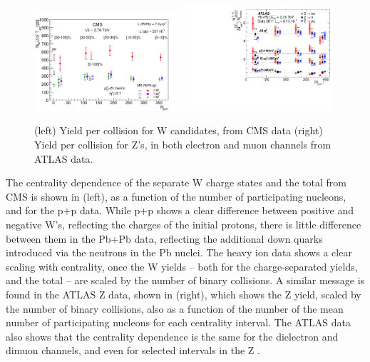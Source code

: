 \begin{figure}[!htb]
\begin{center}
\includegraphics[width=0.49\textwidth]{electroweak_figs/Fig2.pdf}
\includegraphics[width=0.49\textwidth]{electroweak_figs/fig_04.pdf}
\caption[]{(left) Yield per collision for W candidates, from CMS data (right) Yield per collision for Z's, in both electron and muon channels from ATLAS data.}
\label{fig:pas:zw_cent}
\end{center}
\end{figure}

The centrality dependence of the separate W charge states and the total from CMS is shown in \label{fig:pas:zw_cent}(left), 
as a function of the number of participating nucleons, and for the p+p data.  
While p+p shows a clear difference between positive and negative W's, reflecting the charges of the initial protons, there is little
difference between them in the Pb+Pb data, reflecting the additional down quarks introduced via the neutrons in the Pb nuclei.
The heavy ion data shows a clear scaling with centrality, once the W yields -- both for the charge-separated yields, and the
total -- are scaled by the number of binary collisions.
A similar message is found in the ATLAS Z data, shown in \label{fig:pas:zw_cent}(right), which shows the Z yield, scaled by 
the number of binary collisions, also as a function of the number of the mean number of participating nucleons for each
centrality interval.  The ATLAS data also shows that the centrality dependence is the same for the dielectron and dimuon channels,
and even for selected intervals in the Z \pT.

